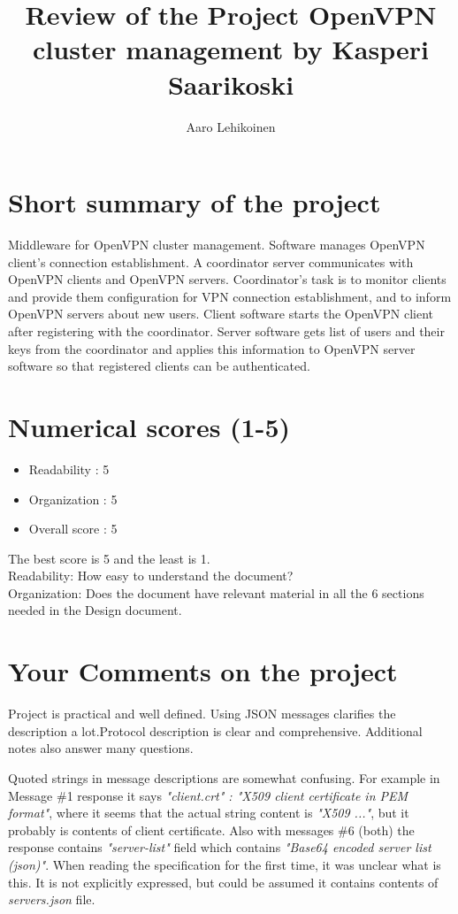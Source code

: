 \documentclass{article}
\begin{document}
\title{Review of the Project OpenVPN cluster management by Kasperi Saarikoski }
\author{Aaro Lehikoinen} 
\maketitle
\section{Short summary of the project}
Middleware for OpenVPN cluster management. Software manages OpenVPN client's connection establishment. A coordinator server communicates with OpenVPN clients and OpenVPN servers. Coordinator's task is to monitor clients and provide them configuration for VPN connection establishment, and to inform OpenVPN servers about new users. Client software starts the OpenVPN client after registering with the coordinator. Server software gets list of users and their keys from the coordinator and applies this information to OpenVPN server software so that registered clients can be authenticated.

\section{Numerical scores (1-5)}


\begin{itemize}
\item Readability : 5
\item Organization : 5
\item Overall score : 5
\end{itemize}

\noindent The best score is 5 and the least is 1.\\
Readability: How easy to understand the document? \\
Organization: Does the document have relevant material in all the 6 sections needed in  the Design document.\\

\section{Your Comments on the project}
Project is practical and well defined. Using JSON messages clarifies the description a lot.Protocol description is clear and comprehensive. Additional notes also answer many questions.

Quoted strings in message descriptions are somewhat confusing. For example in Message \#1 response it says \emph{"client.crt" : "X509 client certificate in PEM format"}, where it seems that the actual string content is \emph{"X509 ..."}, but it probably is contents of client certificate. Also with messages \#6 (both) the response contains \emph{"server-list"} field which contains \emph{"Base64 encoded server list (json)"}. When reading the specification for the first time, it was unclear what is this. It is not explicitly expressed, but could be assumed it contains contents of \emph{servers.json} file.
\end{document}
